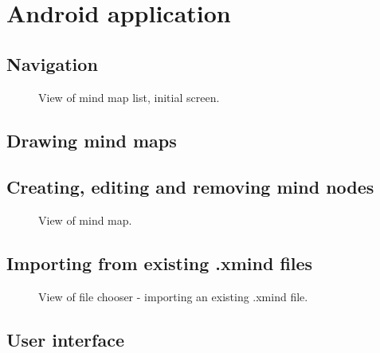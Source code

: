 \section{Android application}
\label{sec:android-app}

\subsection{Navigation}
\label{subsec:drawing}

\begin{figure}[h]
	\centering
	\caption{View of mind map list, initial screen.}
	\label{fig:screen-maplist}
\end{figure}

\subsection{Drawing mind maps}
\label{subsec:drawing}

\subsection{Creating, editing and removing mind nodes}
\label{subsec:drawing}

\begin{figure}[h]
	\centering
	\caption{View of mind map.}
	\label{fig:screen-map}
\end{figure}

\subsection{Importing from existing .xmind files}
\label{subsec:import}

\begin{figure}[h]
	\centering
	\caption{View of file chooser - importing an existing .xmind file.}
	\label{fig:screen-filechooser}
\end{figure}


\subsection{User interface}
\label{subsec:ui}
